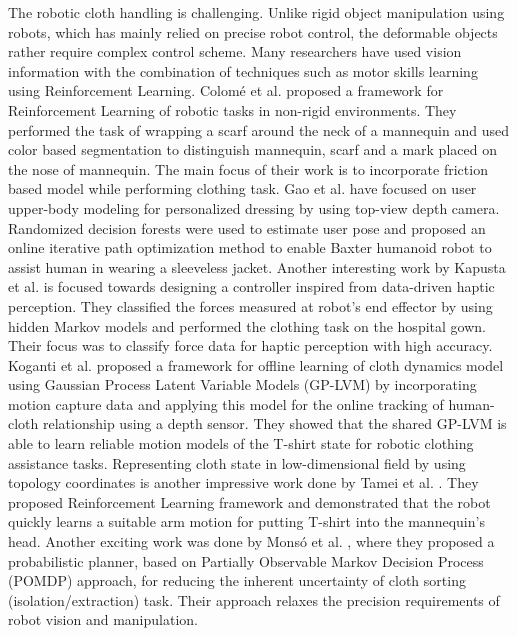 \documentclass[sigconf]{acmart}
\begin{document}
The robotic cloth handling is challenging. Unlike rigid object manipulation using robots, which has mainly relied on precise robot control, the deformable objects rather require complex control scheme. Many researchers have used vision information with the combination of techniques such as motor skills learning using Reinforcement Learning. Colom{\'e} et al. \cite{colome2015friction} proposed a framework for Reinforcement Learning of robotic tasks in non-rigid environments. They performed the task of wrapping a scarf around the neck of a mannequin and used color based segmentation to distinguish mannequin, scarf and a mark placed on the nose of mannequin. The main focus of their work is to incorporate friction based model while performing clothing task. Gao et al. \cite{gao2015user, gao2016iterative} have focused on user upper-body modeling for personalized dressing by using top-view depth camera. Randomized decision forests were used to estimate user pose and proposed an online iterative path optimization method to enable Baxter humanoid robot to assist human in wearing a sleeveless jacket. Another interesting work by Kapusta et al. \cite{kapusta2016data} is focused towards designing a controller inspired from data-driven haptic perception. They classified the forces measured at robot's end effector by using hidden Markov models and performed the clothing task on the hospital gown. Their focus was to classify force data for haptic perception with high accuracy. Koganti et al. \cite{koganti2015cloth} proposed a framework for offline learning of cloth dynamics model using Gaussian Process Latent Variable Models (GP-LVM) by incorporating motion capture data and applying this model for the online tracking of human-cloth relationship using a depth sensor. They showed that the shared GP-LVM is able to learn reliable motion models of the T-shirt state for robotic clothing assistance tasks. Representing cloth state in low-dimensional field by using topology coordinates is another impressive work done by Tamei et al. \cite{tamei2011reinforcement}. They proposed Reinforcement Learning framework and demonstrated that the robot quickly learns a suitable arm motion for putting T-shirt into the mannequin's head. Another exciting work was done by Mons{\'o} et al. \cite{monso2012pomdp}, where they proposed a probabilistic planner, based on Partially Observable Markov Decision Process (POMDP) approach, for reducing the inherent uncertainty of cloth sorting (isolation/extraction) task. Their approach relaxes the precision requirements of robot vision and manipulation.
\end{document}
